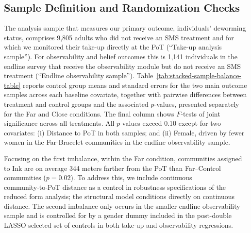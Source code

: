 \documentclass[12pt,a4paper]{article}
\begin{document}
\subsection{Sample Definition and Randomization Checks} 





The analysis sample that measures our primary outcome, individuals' deworming status, comprises 9,805 adults who did not receive an SMS treatment and for which we monitored their take-up directly at the PoT (``Take-up analysis sample''). For observability and belief outcomes this is 1,141 individuals in the endline survey that receive the observability module but do not receive an SMS treatment (``Endline observability sample''). Table~\ref{tab:stacked-sample-balance-table} reports control group means and standard errors for the two main outcome samples across each baseline covariate, together with pairwise differences between treatment and control groups and the associated $p$‑values, presented separately for the Far and Close conditions. The final column shows $F$‑tests of joint significance across all treatments.  All $p$‑values exceed 0.10 except for two covariates: (i) Distance to PoT in both samples; and (ii) Female, driven by fewer women in the Far-Bracelet communities in the endline observability sample. 

Focusing on the first imbalance, within the Far condition, communities assigned to Ink are on average 344 meters farther from the PoT than Far–Control communities ($p = 0.02$). To address this, we include continuous community‑to‑PoT distance as a control in robustness specifications of the reduced form analysis; the structural model conditions directly on continuous distance. The second imbalance only occurs in the smaller endline observability sample and is controlled for by a gender dummy included in the post-double LASSO selected set of controls in both take-up and observability regressions.
\end{document}
